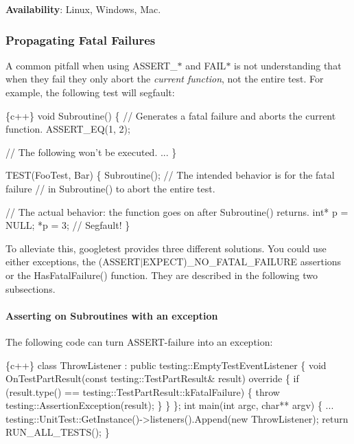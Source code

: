 {\bfseries Availability}\+: Linux, Windows, Mac.

\subsubsection*{Propagating Fatal Failures}

A common pitfall when using {\ttfamily A\+S\+S\+E\+R\+T\+\_\+$\ast$} and {\ttfamily F\+A\+I\+L$\ast$} is not understanding that when they fail they only abort the {\itshape current function}, not the entire test. For example, the following test will segfault\+:


\begin{DoxyCode}
\{c++\}
void Subroutine() \{
  // Generates a fatal failure and aborts the current function.
  ASSERT\_EQ(1, 2);

  // The following won't be executed.
  ...
\}

TEST(FooTest, Bar) \{
  Subroutine();  // The intended behavior is for the fatal failure
                 // in Subroutine() to abort the entire test.

  // The actual behavior: the function goes on after Subroutine() returns.
  int* p = NULL;
  *p = 3;  // Segfault!
\}
\end{DoxyCode}


To alleviate this, googletest provides three different solutions. You could use either exceptions, the {\ttfamily (A\+S\+S\+E\+R\+T$\vert$\+E\+X\+P\+E\+CT)\+\_\+\+N\+O\+\_\+\+F\+A\+T\+A\+L\+\_\+\+F\+A\+I\+L\+U\+RE} assertions or the {\ttfamily Has\+Fatal\+Failure()} function. They are described in the following two subsections.

\paragraph*{Asserting on Subroutines with an exception}

The following code can turn A\+S\+S\+E\+R\+T-\/failure into an exception\+:


\begin{DoxyCode}
\{c++\}
class ThrowListener : public testing::EmptyTestEventListener \{
  void OnTestPartResult(const testing::TestPartResult& result) override \{
    if (result.type() == testing::TestPartResult::kFatalFailure) \{
      throw testing::AssertionException(result);
    \}
  \}
\};
int main(int argc, char** argv) \{
  ...
  testing::UnitTest::GetInstance()->listeners().Append(new ThrowListener);
  return RUN\_ALL\_TESTS();
\}
\end{DoxyCode}


